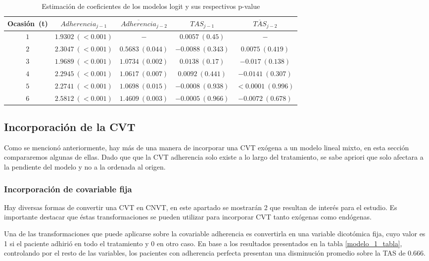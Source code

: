 \documentclass[spanish]{article}
\numberwithin{figure}{subsection}
\numberwithin{equation}{subsection}
\numberwithin{table}{subsection}
\begin{document}
\begin{table}[H]
	\centering
	\caption{Estimación de coeficientes de los modelos logit y sus respectivos p-value}
	\label{exog_table}
	\begin{tabular}{*{5}{|c}|}
		\hline
		Ocasión\ (t) & $Adherencia_{j-1}$ & $\overline{Adherencia}_{j-2}$ & $TAS_{j-1}$ &
		$\overline{TAS}_{j-2}$ \\
		\hline
		\hline
		$1$ & $1.9302\ (<0.001)$ & $-$ & $0.0057\ (0.45)$ & $-$ \\
		$2$ & $2.3047\ (<0.001)$ & $0.5683\ (0.044)$ & $-0.0088\ (0.343)$ &
		$0.0075\ (0.419)$ \\
		$3$ & $1.9689\ (<0.001)$ & $1.0734\ (0.002)$ & $0.0138\ (0.17)$ &
		$-0.017\ (0.138)$ \\
		$4$ & $2.2945\ (<0.001)$ & $1.0617\ (0.007)$ & $0.0092\ (0.441)$ &
		$-0.0141\ (0.307)$ \\
		$5$ & $2.2741\ (<0.001)$ & $1.0698\ (0.015)$ & $-0.0008\ (0.938)$ &
		$<0.0001\ (0.996)$ \\
		$6$ & $2.5812\ (<0.001)$ & $1.4609\ (0.003)$ & $-0.0005\ (0.966)$ &
		$-0.0072\ (0.678)$ \\
		\hline
	\end{tabular}
\end{table}

\subsection{Incorporación de la CVT}

Como se mencionó anteriormente, hay más de una manera de incorporar una CVT
exógena a un modelo lineal mixto, en esta sección compararemos algunas de ellas.
Dado que que la CVT adherencia solo existe a lo largo del tratamiento, se sabe
apriori que solo afectara a la pendiente del modelo y no a la ordenada al
origen.

\subsubsection{Incorporación de covariable fija}

Hay diversas formas de convertir una CVT en CNVT, en este apartado se mostrarán
2 que resultan de interés para el estudio. Es importante destacar que éstas
transformaciones se pueden utilizar para incorporar CVT tanto exógenas como
endógenas.

Una de las transformaciones que puede aplicarse sobre la covariable adherencia
es convertirla en una variable dicotómica fija, cuyo valor es 1 si el paciente
adhirió en todo el tratamiento y 0 en otro caso. En base a los resultados
presentados en la tabla \ref{modelo_1_tabla}, controlando por el resto de las
variables, los pacientes con adherencia perfecta presentan una disminución
promedio sobre la TAS de 0.666.
\end{document}
